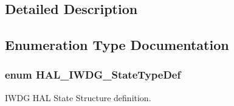 \subsection{Detailed Description}


\subsection{Enumeration Type Documentation}
\hypertarget{group___i_w_d_g___exported___types_ga61699dc6f24a3edecddd16018560d0e5}{
\subsubsection[{H\-A\-L\-\_\-\-I\-W\-D\-G\-\_\-\-State\-Type\-Def}]{\setlength{\rightskip}{0pt plus 5cm}enum {\bf H\-A\-L\-\_\-\-I\-W\-D\-G\-\_\-\-State\-Type\-Def}}}\label{group___i_w_d_g___exported___types_ga61699dc6f24a3edecddd16018560d0e5}


I\-W\-D\-G H\-A\-L State Structure definition. 

